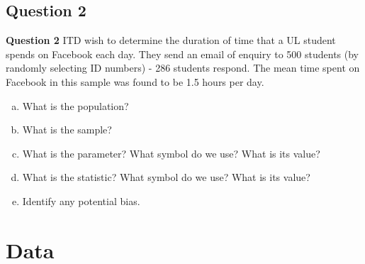 \documentclass[compress]{beamer}        %
\makeatletter
\newcommand{\tcb}{\textcolor{beamer@blendedblue}}
\makeatother
\begin{document}
\subsection{Question 2}
\begin{frame}{\bf \tcb{Question 2}}
ITD wish to determine the duration of time that a UL student spends on Facebook each day. They send an email of enquiry to 500 students (by randomly selecting ID numbers) - 286 students respond. The mean time spent on Facebook in this sample was found to be 1.5 hours per day.\\[0.4cm]
\begin{enumerate}[a)]
\item What is the population?
\item What is the sample?
\item What is the parameter? What symbol do we use? What is its value?
\item What is the statistic? What symbol do we use? What is its value?
\item Identify any potential bias.
\end{enumerate}
\end{frame}







\section{Data}
\end{document}

